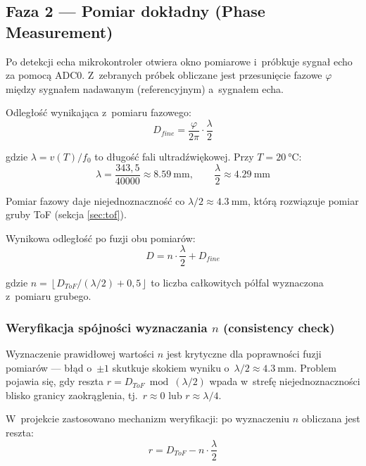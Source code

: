 \documentclass[a4paper,11pt]{article}
\begin{document}
	\subsection{Faza 2 --- Pomiar dokładny (Phase Measurement)}
	\label{sec:phase}
	
	Po detekcji echa mikrokontroler otwiera okno pomiarowe i~próbkuje sygnał
	echo za pomocą ADC0. Z~zebranych próbek obliczane jest przesunięcie fazowe
	$\varphi$ między sygnałem nadawanym (referencyjnym) a~sygnałem echa.
	
	Odległość wynikająca z~pomiaru fazowego:
	\begin{equation}
		D_{fine} = \frac{\varphi}{2\pi} \cdot \frac{\lambda}{2}
		\label{eq:phase}
	\end{equation}
	
	gdzie $\lambda = v(T) / f_0$ to długość fali ultradźwiękowej. Przy
	$T = \SI{20}{\celsius}$:
	\begin{equation}
		\lambda = \frac{343{,}5}{40000} \approx \SI{8,59}{\milli\metre}, \qquad
		\frac{\lambda}{2} \approx \SI{4,29}{\milli\metre}
		\label{eq:lambda}
	\end{equation}
	
	Pomiar fazowy daje niejednoznaczność co $\lambda/2 \approx \SI{4,3}{\milli\metre}$,
	którą rozwiązuje pomiar gruby ToF (sekcja \ref{sec:tof}).
	
	Wynikowa odległość po fuzji obu pomiarów:
	\begin{equation}
		\boxed{D = n \cdot \frac{\lambda}{2} + D_{fine}}
		\label{eq:wynik}
	\end{equation}
	
	gdzie $n = \left\lfloor D_{ToF} / (\lambda/2) + 0{,}5 \right\rfloor$ to liczba
	całkowitych półfal wyznaczona z~pomiaru grubego.
	
	\subsubsection{Weryfikacja spójności wyznaczania \texorpdfstring{$n$}{n} (consistency check)}
	\label{sec:consistency_check}
	
	Wyznaczenie prawidłowej wartości $n$ jest krytyczne dla poprawności fuzji
	pomiarów --- błąd o~$\pm 1$ skutkuje skokiem wyniku o~$\lambda/2 \approx
	\SI{4,3}{\milli\metre}$. Problem pojawia się, gdy reszta $r = D_{ToF}
	\bmod (\lambda/2)$ wpada w~strefę niejednoznaczności blisko granicy
	zaokrąglenia, tj.\ $r \approx 0$ lub $r \approx \lambda/4$.
	
	W~projekcie zastosowano mechanizm weryfikacji: po wyznaczeniu $n$ obliczana
	jest reszta:
	\begin{equation}
		r = D_{ToF} - n \cdot \frac{\lambda}{2}
		\label{eq:consistency_r}
	\end{equation}
	
\end{document}
